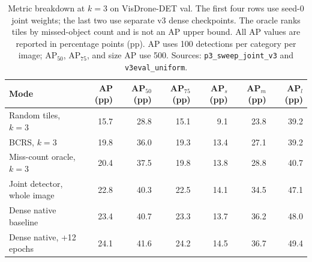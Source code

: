 \begin{table}[t]
\caption{Metric breakdown at $k{=}3$ on VisDrone-DET val. The first four rows use seed-0 joint weights; the last two use separate v3 dense checkpoints. The oracle ranks tiles by missed-object count and is not an AP upper bound. All AP values are reported in percentage points (pp). AP uses 100 detections per category per image; AP$_{50}$, AP$_{75}$, and size AP use 500. Sources: \texttt{p3\_sweep\_joint\_v3} and \texttt{v3eval\_uniform}.}
\label{tab:budget-breakdown}
\centering
\begin{tabular}{lrrrrrr}
\toprule
Mode & AP (pp) & AP$_{50}$ (pp) & AP$_{75}$ (pp) & AP$_s$ (pp) & AP$_m$ (pp) & AP$_l$ (pp) \\
\midrule
Random tiles, $k{=}3$ & 15.7 & 28.8 & 15.1 & 9.1 & 23.8 & 39.2 \\
BCRS, $k{=}3$ & 19.8 & 36.0 & 19.3 & 13.4 & 27.1 & 39.2 \\
Miss-count oracle, $k{=}3$ & 20.4 & 37.5 & 19.8 & 13.8 & 28.8 & 40.7 \\
Joint detector, whole image & 22.8 & 40.3 & 22.5 & 14.1 & 34.5 & 47.1 \\
Dense native baseline & 23.4 & 40.7 & 23.3 & 13.7 & 36.2 & 48.0 \\
Dense native, +12 epochs & 24.1 & 41.6 & 24.2 & 14.5 & 36.7 & 49.4 \\
\bottomrule
\end{tabular}
\end{table}
